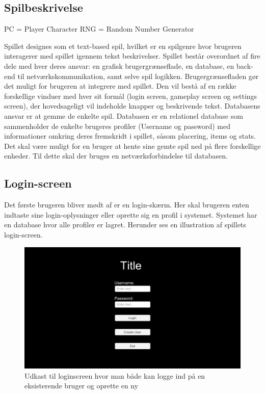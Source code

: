 \newpage

\subsection{Spilbeskrivelse}

PC = Player Character
RNG = Random Number Generator

Spillet designes som et text-based spil, hvilket er en spilgenre hvor brugeren interagerer med spillet igennem tekst beskrivelser. Spillet består overordnet af fire dele med hver deres ansvar: en grafisk brugergrænseflade, en database, en back-end til netværkskommunikation, samt selve spil logikken. Brugergrænsefladen gør det muligt for brugeren at integrere med spillet. Den vil bestå af en række forskellige vinduer med hver sit formål (login screen, gameplay screen og settings screen), der hovedsageligt vil indeholde knapper og beskrivende tekst. Databasens ansvar er at gemme de enkelte spil. Databasen er en relationel database som sammenholder de enkelte brugeres profiler (Username og password) med informationer omkring deres fremskridt i spillet, såsom placering, items og stats. Det skal være muligt for en bruger at hente sine gemte spil ned på flere forskellige enheder. Til dette skal der bruges en netværksforbindelse til databasen.   

\subsection{Login-screen}
Det første brugeren bliver mødt af er en login-skærm. Her skal brugeren enten indtaste sine login-oplysninger eller oprette sig en profil i systemet. Systemet har en database hvor alle profiler er lagret. Herunder ses en illustration af spillets login-screen. 

\begin{figure}[H]
\centering
\includegraphics[width = \textwidth]{02-Body/Images/Loginscreen-udkast.png}
\caption{Udkast til loginscreen hvor man både kan logge ind på en eksisterende bruger og oprette en ny}
\label{fig:Loginscreen-udkast}
\end{figure}

